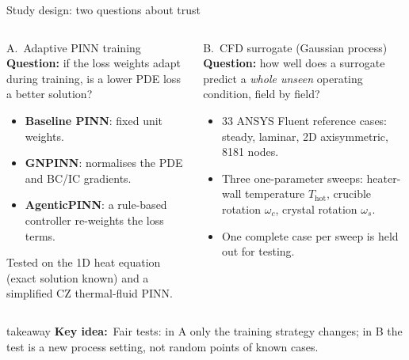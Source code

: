 \documentclass[aspectratio=169,10pt,t]{beamer}
\newcommand{\key}[1]{\textcolor{qblue}{\textbf{#1}}}
\newcommand{\takeaway}[1]{%
  \par\vfill
  \begin{beamercolorbox}[wd=\linewidth,sep=5pt,rounded=true]{takeaway}
    \small\textcolor{qblue}{\textbf{Key idea:}}~#1
  \end{beamercolorbox}\vspace{1mm}}
\begin{document}
\begin{frame}{Study design: two questions about trust}
\begin{columns}[T,onlytextwidth]
\begin{block}{A.\ Adaptive PINN training}
\small \textbf{Question:} if the loss weights adapt during training, is a lower PDE loss a better solution?
\begin{itemize}\small
  \item \key{Baseline PINN}: fixed unit weights.
  \item \key{GNPINN}: normalises the PDE and BC/IC gradients.
  \item \key{AgenticPINN}: a rule-based controller re-weights the loss terms.
\end{itemize}
\small Tested on the 1D heat equation (exact solution known) and a simplified CZ thermal-fluid PINN.
\end{block}
\begin{block}{B.\ CFD surrogate (Gaussian process)}
\small \textbf{Question:} how well does a surrogate predict a \emph{whole unseen} operating condition, field by field?
\begin{itemize}\small
  \item 33 ANSYS Fluent reference cases: steady, laminar, 2D axisymmetric, 8181 nodes.
  \item Three one-parameter sweeps: heater-wall temperature $T_{\mathrm{hot}}$, crucible rotation $\omega_c$, crystal rotation $\omega_s$.
  \item One complete case per sweep is held out for testing.
\end{itemize}
\end{block}
\end{columns}
\takeaway{Fair tests: in A only the training strategy changes; in B the test is a new process setting, not random points of known cases.}
\end{frame}
\end{document}
